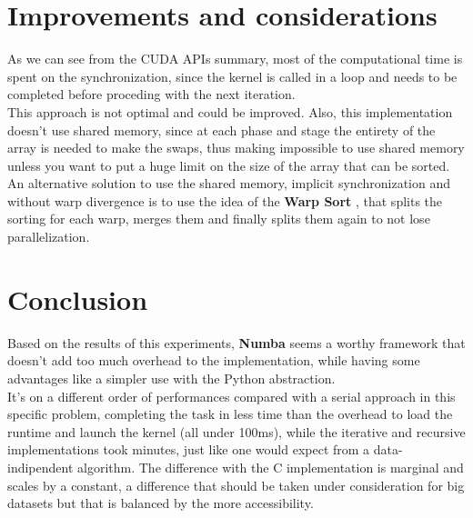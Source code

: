 \documentclass[a4paper, 12pt, oneside]{article}
\begin{document}
\section{Improvements and considerations}
As we can see from the CUDA APIs summary, most of the computational time is spent on the synchronization, since the kernel is called in a loop and needs to be completed before proceding with the next iteration.\\
This approach is not optimal and could be improved. Also, this implementation doesn't use shared memory, since at each phase and stage the entirety of the array is needed to make the swaps, thus making impossible to use shared memory unless you want to put a huge limit on the size of the array that can be sorted.
An alternative solution to use the shared memory, implicit synchronization and without warp divergence is to use the idea of the \textbf{Warp Sort} \cite{warpsort}, that splits the sorting for each warp, merges them and finally splits them again to not lose parallelization.

\section{Conclusion}
Based on the results of this experiments, \textbf{Numba} seems a worthy framework that doesn't add too much overhead to the implementation, while having some advantages like a simpler use with the Python abstraction.\\
It's on a different order of performances compared with a serial approach in this specific problem, completing the task in less time than the overhead to load the runtime and launch the kernel (all under 100ms), while the iterative and recursive implementations took minutes, just like one would expect from a data-indipendent algorithm.
The difference with the C implementation is marginal and scales by a constant, a difference that should be taken under consideration for big datasets but that is balanced by the more accessibility.
\printbibliography
\end{document}
